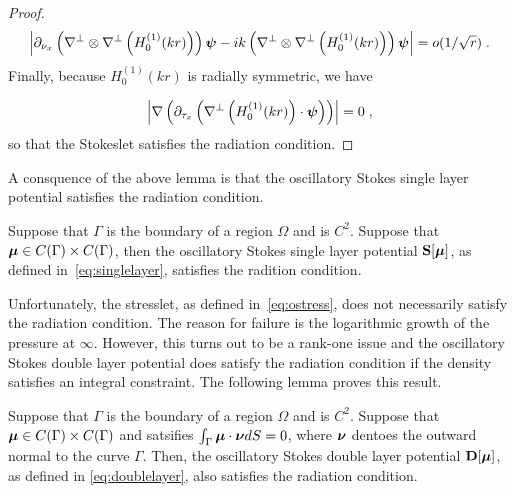 \begin{proof}
\begin{equation}
\left | \partial_{{\nu_x}} \left(\nabla^\perp \otimes
\nabla^\perp \left (H_0^{(1)} (kr) \right ) \right){\boldsymbol \psi}
- ik \left(\nabla^\perp \otimes \nabla^\perp
\left (H_0^{(1)} (kr) \right ) \right){\boldsymbol \psi} \right | =
o ( 1/\sqrt{r} ) \; . \nonumber
\end{equation}
Finally, because $H_0^{(1)}(kr)$ is radially symmetric,
we have

\begin{equation}
\left | \nabla \left( \partial_{\tau_x} \left ( 
\nabla^\perp \left (H_0^{(1)} (kr) \right ) \cdot {\boldsymbol \psi}  \right )
\right) \right | = 0 \; , \nonumber
\end{equation}
so that the Stokeslet satisfies the radiation condition.
\end{proof}
A consquence of the above lemma is that the oscillatory Stokes
single layer potential satisfies the radiation condition.
\begin{cor}
Suppose that $\Gamma$ is the boundary of a region $\Omega$
and is $C^{2}$. 
Suppose that ${\boldsymbol \mu} \in C(\Gamma)\times C(\Gamma)$, then
the oscillatory Stokes single layer potential ${\bf S}[{\boldsymbol \mu}]$,
as defined in~\cref{eq:singlelayer}, satisfies the radition condition.
\end{cor}
Unfortunately, the stresslet, as defined in~\cref{eq:ostress}, 
does not necessarily satisfy the radiation condition.
The reason for failure is the logarithmic growth of 
the pressure at $\infty$.
However, this turns out to be a rank-one issue and 
the oscillatory Stokes double layer potential
does satisfy the radiation condition 
if the density satisfies an integral constraint.
The following lemma proves this result.

\begin{lem}
Suppose that $\Gamma$ is the boundary of a region $\Omega$
and is $C^{2}$. 
Suppose that ${\boldsymbol \mu} \in C(\Gamma) \times C(\Gamma)$ and satsifies
$\int_{\Gamma} {\boldsymbol \mu} \cdot {\boldsymbol \nu} dS = 0$, where
${\boldsymbol \nu}$ dentoes the outward normal to the curve $\Gamma$.
Then, the oscillatory Stokes 
double layer potential ${\bf D}[{\boldsymbol \mu}]$, as defined in \eqref{eq:doublelayer},
also satisfies the radiation condition.
\end{lem}

